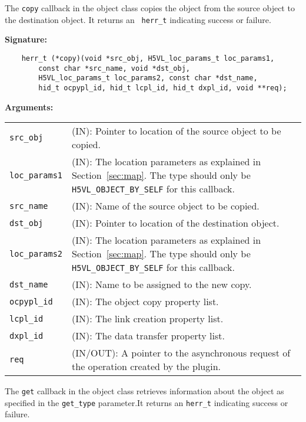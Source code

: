 The \texttt{copy} callback in the object class  copies the object
from the source object to the destination object. It returns an \texttt{
  herr\_t} indicating success or failure.\bigskip

\begin{mdframed}[style=bgbox]
\textbf{Signature:}
\begin{lstlisting}
    herr_t (*copy)(void *src_obj, H5VL_loc_params_t loc_params1, 
        const char *src_name, void *dst_obj, 
        H5VL_loc_params_t loc_params2, const char *dst_name,
        hid_t ocpypl_id, hid_t lcpl_id, hid_t dxpl_id, void **req);
\end{lstlisting}

\textbf{Arguments:}\\
\begin{tabular}{l p{13.5cm}}
  \texttt{src\_obj} & (IN): Pointer to location of the source object to
  be copied.\\
  \texttt{loc\_params1} & (IN): The location parameters as explained in
  Section~\ref{sec:map}. The type should only be \texttt{H5VL\_OBJECT\_BY\_SELF} for this callback.\\
  \texttt{src\_name} & (IN): Name of the source object to
  be copied.\\
  \texttt{dst\_obj} & (IN): Pointer to location of the destination
  object.\\
  \texttt{loc\_params2} & (IN): The location parameters as explained in
  Section~\ref{sec:map}. The type should only be \texttt{H5VL\_OBJECT\_BY\_SELF} for this callback.\\
  \texttt{dst\_name} & (IN): Name to be assigned to the new copy.\\
  \texttt{ocpypl\_id} & (IN): The object copy property list.\\
  \texttt{lcpl\_id} & (IN): The link creation property list.\\
  \texttt{dxpl\_id} & (IN): The data transfer property list.\\
  \texttt{req} & (IN/OUT): A pointer to the asynchronous request of the
  operation created by the plugin.\\
\end{tabular}
\end{mdframed}

The \texttt{get} callback in the object class retrieves information
about the object as specified in the \texttt{get\_type} parameter.It
returns an \texttt{herr\_t} indicating success or failure.\bigskip

